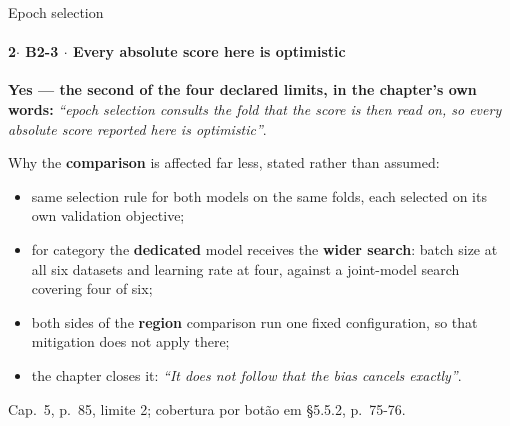 \documentclass{beamer}
\begin{document}
\begin{frame}[noframenumbering]{Epoch selection}
    \framesubtitle{\normalsize 2$\cdot$ \textbf{B2-3} $\cdot$ Every absolute score here is optimistic}
    \hypertarget{b23}{}
    \small
    \textcolor{alert}{\textbf{Yes --- the second of the four declared limits, in the chapter's own words:}} \textit{``epoch selection consults the fold that the score is then read on, so every absolute score reported here is optimistic''}.

    Why the \textbf{comparison} is affected far less, stated rather than assumed:
    \begin{itemize}\setlength{\itemsep}{0pt}\setlength{\parskip}{0pt}
        \item same selection rule for both models on the same folds, each selected on its own validation objective;
        \item for category the \textbf{dedicated} model receives the \textbf{wider search}: batch size at all six datasets and learning rate at four, against a joint-model search covering four of six;
        \item both sides of the \textbf{region} comparison run one fixed configuration, so that mitigation does not apply there;
        \item the chapter closes it: \textit{``It does not follow that the bias cancels exactly''}.
    \end{itemize}
    \vfill
    {\scriptsize
    \begin{minipage}[b]{0.775\linewidth}\raggedright\textcolor{black!70}{Cap.~5, p.~85, limite 2; cobertura por botão em §5.5.2, p.~75-76.}\end{minipage}\hfill
    \begin{minipage}[b]{0.20\linewidth}\raggedleft \hyperlink{b0}{}\end{minipage}}
\end{frame}
\end{document}
